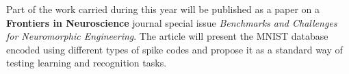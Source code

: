 Part of the work carried during this year will be published as a paper on a 
\textbf{Frontiers in Neuroscience} journal special issue \emph{Benchmarks and 
Challenges for Neuromorphic Engineering}. The article will present the MNIST
database encoded using different types of spike codes and propose it as a
standard way of testing learning and recognition tasks.